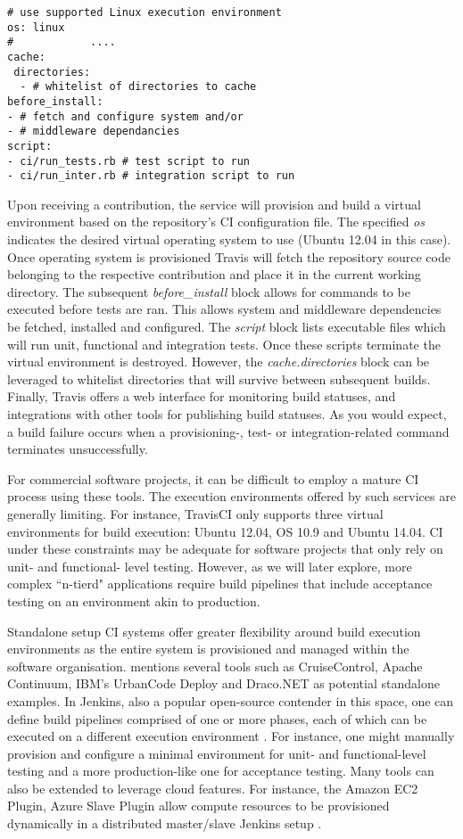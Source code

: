 \documentclass[journal]{IEEEtran}
\begin{document}
\begin{verbatim}
# use supported Linux execution environment
os: linux 
#		     ....
cache:
 directories:
  - # whitelist of directories to cache
before_install:
- # fetch and configure system and/or
- # middleware dependancies
script: 
- ci/run_tests.rb # test script to run
- ci/run_inter.rb # integration script to run
  \end{verbatim}
\par
Upon receiving a contribution, the service will provision
and build a virtual environment based on the repository's CI configuration
file. The specified \textit{os} indicates the desired virtual operating system 
to use (Ubuntu 12.04 in this case). Once operating system is provisioned
Travis will fetch the repository source code belonging to the respective contribution
and place it in the current working directory. The subsequent \textit{before\_install}
block allows for commands to be executed before tests are ran. This allows system
 and middleware dependencies be fetched, installed and configured. The \textit{script} block
 lists executable files which will run unit, functional and integration tests. Once
 these scripts terminate the virtual environment is destroyed. However, 
 the \textit{cache.directories} block can be leveraged to whitelist directories 
 that will survive between subsequent builds. Finally, Travis offers a web interface for monitoring build statuses, and 
integrations with other tools for publishing build statuses. As you would expect,
a build failure occurs when a provisioning-, test- or integration-related command
terminates unsuccessfully. 
\par
For commercial software projects, it can be difficult to employ a mature CI process using these tools.
The execution environments offered by such services are generally limiting. 
For instance, TravisCI only supports three virtual environments for build execution: Ubuntu 12.04,
OS 10.9 and Ubuntu 14.04. CI under these constraints may be
adequate for software projects that only rely on unit- and functional- level
testing. However, as we will later explore, more complex ``n-tierd" applications require build pipelines that 
include acceptance testing on an environment akin to production. 
\par
Standalone setup CI systems offer greater flexibility around build 
execution environments as the entire system
is provisioned and managed within the software organisation. 
\citet{Duvall} mentions several tools such
as CruiseControl, Apache Continuum, IBM's UrbanCode Deploy and Draco.NET 
as potential standalone examples. In Jenkins, also a popular open-source contender in this space, 
one can define build pipelines comprised of one or more phases, each of which can be executed on a different  
execution environment \citep{Smart}. For instance, one might manually provision and configure a 
minimal environment for unit- and functional-level testing and a more production-like 
one for acceptance testing. Many tools can also be extended to leverage cloud features. For instance,
the Amazon EC2 Plugin, Azure Slave Plugin allow compute resources to be provisioned dynamically
 in a distributed master/slave Jenkins setup \citep{Smart}.
\end{document}
